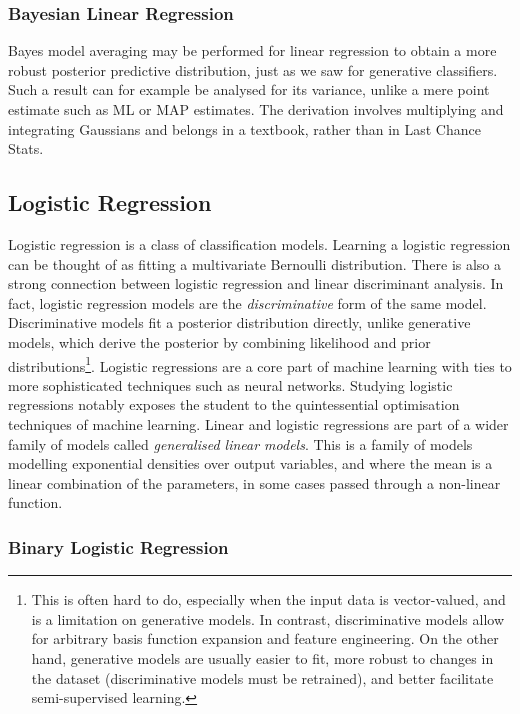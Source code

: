 \documentclass[11pt]{amsart}
\begin{document}
\subsubsection{Bayesian Linear Regression}

Bayes model averaging may be performed for linear regression to obtain a more robust posterior predictive distribution, just as we saw for generative classifiers. Such a result can for example be analysed for its variance, unlike a mere point estimate such as ML or MAP estimates. The derivation involves multiplying and integrating Gaussians and belongs in a textbook, rather than in Last Chance Stats.

\subsection{Logistic Regression}

Logistic regression is a class of classification models. Learning a logistic regression can be thought of as fitting a multivariate Bernoulli distribution. There is also a strong connection between logistic regression and linear discriminant analysis. In fact, logistic regression models are the \emph{discriminative} form of the same model. Discriminative models fit a posterior distribution directly, unlike generative models, which derive the posterior by combining likelihood and prior distributions\footnote{This is often hard to do, especially when the input data is vector-valued, and is a limitation on generative models. In contrast, discriminative models allow for arbitrary basis function expansion and feature engineering. On the other hand, generative models are usually easier to fit, more robust to changes in the dataset (discriminative models must be retrained), and better facilitate semi-supervised learning.}. Logistic regressions are a core part of machine learning with ties to more sophisticated techniques such as neural networks. Studying logistic regressions notably exposes the student to the quintessential optimisation techniques of machine learning. Linear and logistic regressions are part of a wider family of models called \emph{generalised linear models}. This is a family of models modelling exponential densities over output variables, and where the mean is a linear combination of the parameters, in some cases passed through a non-linear function.

\subsubsection{Binary Logistic Regression}
\end{document}
